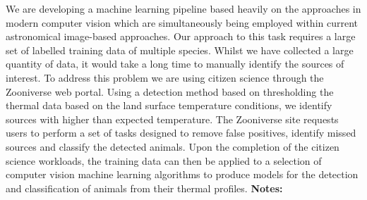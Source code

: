 \documentclass{report}
\begin{document}
{{{{{{{{{{{{{{{{{{{{{{{{{{{{{{{{{{{{{{{{{{{{{{{{{{{{{{{{{{{{{{{{{{{{{{{{{{{{{{{{{{{{{{{{{{{{{{{{{{{{{{{{{{{{{{{{{{{{{{{{{{{{{We are developing a machine learning pipeline based heavily on the approaches in modern computer vision which are simultaneously being employed within current astronomical image-based approaches. Our approach to this task requires a large set of labelled training data of multiple species. Whilst we have collected a large quantity of data, it would take a long time to manually identify the sources of interest. To address this problem we are using citizen science through the Zooniverse web portal. Using a detection method based on thresholding the thermal data based on the land surface temperature conditions, we identify sources with higher than expected temperature. The Zooniverse site requests users to perform a set of tasks designed to remove false positives, identify missed sources and classify the detected animals. Upon the completion of the citizen science workloads, the training data can then be applied to a selection of computer vision machine learning algorithms to produce models for the detection and classification of animals from their thermal profiles.\newline
{\bf Notes:}\newline
{\newpage
}}}}}}}}}}}}}}}}}}}}}}}}}}}}}}}}}}}}}}}}}}}}}}}}}}}}}}}}}}}}}}}}}}}}}}}}}}}}}}}}}}}}}}}}}}}}}}}}}}}}}}}}}}}}}}}}}}}}}}}}}}}}}}
\end{document}
